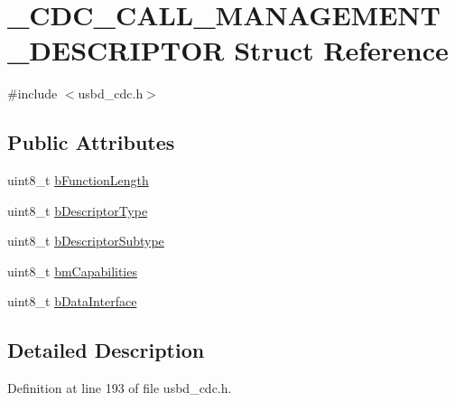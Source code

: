 \hypertarget{struct___c_d_c___c_a_l_l___m_a_n_a_g_e_m_e_n_t___d_e_s_c_r_i_p_t_o_r}{}\section{\+\_\+\+C\+D\+C\+\_\+\+C\+A\+L\+L\+\_\+\+M\+A\+N\+A\+G\+E\+M\+E\+N\+T\+\_\+\+D\+E\+S\+C\+R\+I\+P\+T\+OR Struct Reference}
\label{struct___c_d_c___c_a_l_l___m_a_n_a_g_e_m_e_n_t___d_e_s_c_r_i_p_t_o_r}


{\ttfamily \#include $<$usbd\+\_\+cdc.\+h$>$}

\subsection*{Public Attributes}
\begin{DoxyCompactItemize}
\item 
uint8\+\_\+t \hyperlink{struct___c_d_c___c_a_l_l___m_a_n_a_g_e_m_e_n_t___d_e_s_c_r_i_p_t_o_r_a67c9d008203a3eca2b11bfaead2ee508}{b\+Function\+Length}
\item 
uint8\+\_\+t \hyperlink{struct___c_d_c___c_a_l_l___m_a_n_a_g_e_m_e_n_t___d_e_s_c_r_i_p_t_o_r_ad0b4159e2168c9715af11ff5e74c2fd8}{b\+Descriptor\+Type}
\item 
uint8\+\_\+t \hyperlink{struct___c_d_c___c_a_l_l___m_a_n_a_g_e_m_e_n_t___d_e_s_c_r_i_p_t_o_r_a3e1abaaf7e6ed4f46ad8cd52fd82d47a}{b\+Descriptor\+Subtype}
\item 
uint8\+\_\+t \hyperlink{struct___c_d_c___c_a_l_l___m_a_n_a_g_e_m_e_n_t___d_e_s_c_r_i_p_t_o_r_ac915bf6e709a2cd06bd424a033c96a9b}{bm\+Capabilities}
\item 
uint8\+\_\+t \hyperlink{struct___c_d_c___c_a_l_l___m_a_n_a_g_e_m_e_n_t___d_e_s_c_r_i_p_t_o_r_ac78c72c5ec7c4aeba89379c07041037a}{b\+Data\+Interface}
\end{DoxyCompactItemize}


\subsection{Detailed Description}


Definition at line 193 of file usbd\+\_\+cdc.\+h.



